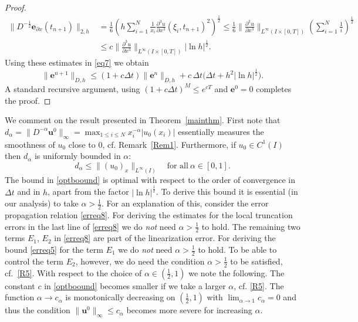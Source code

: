 \documentclass{siamltex}
\newcommand{\be}{\mathbf e}
\newcommand{\bu}{\mathbf u}
\begin{document}
{\begin{proof}
\[ \begin{split} 
  \|D^{-\frac12}\be_{\partial x}(t_{n+1})\|_{2,h} & = \frac16 \left( h \sum_{i=1}^N \frac{1}{x_i} \frac{\partial^3 u}{\partial x^3}(\xi_i,t_{n+1})^2 \right)^\frac12 
   \leq \frac{1}{6}\|\frac{\partial^3 u}{\partial  x^3}\|_{L^\infty(I\times[0,T])} \left( \sum_{i=1}^N \frac{1}{i}\right)^\frac12 \\
  & \leq c \|\frac{\partial^3 u}{\partial  x^3}\|_{L^\infty(I\times[0,T])} |\ln h|^\frac12.
\end{split} \]
Using these estimates in \eqref{eq7} we obtain
\[
  \|\be^{n+1}\|_{D,h} \leq (1 + c \Delta t)\|\be^n\|_{D,h} + c\, \Delta t \big( \Delta t + h^2 |\ln h|^\frac12\big).
\]
A standard recursive argument, using $(1+ c \Delta t)^M \leq e^{c T}$ and $\be^0=0$ completes the proof.
\end{proof}

We comment on the result presented in Theorem~\ref{mainthm}. First note that  $d_\alpha=\|D^{-\alpha}\bu^0\|_\infty= \max_{1 \leq i \leq N} x_i^{-\alpha}|u_0(x_i)|$ essentially measures the smoothness of $u_0$ close to 0, cf. Remark~\ref{Rem1}. 
Furthermore, if $u_0 \in C^1(I)$ then $d_\alpha$ is uniformly bounded in $\alpha$: 
\begin{equation} \label{destimate} d_\alpha \leq \|(u_0)_x\|_{L^\infty(I)} \quad \text{for all}~\alpha \in [0,1]. 
\end{equation}
The bound in \eqref{optboound} is optimal with respect to the order of convergence in $\Delta t$ and in $h$, apart from the factor $|\ln h|^\frac12$. To derive this bound it is essential (in our analysis) to take $\alpha > \tfrac12$. For an explanation of this, consider the error propagation relation \eqref{erreq8}. For  deriving the estimates for the local truncation errors in the last line of \eqref{erreq8} we do \emph{not} need $\alpha > \tfrac12$ to hold. The remaining two terms $E_1$, $E_2$ in \eqref{erreq8} are part of the linearization error. For  deriving the bound \eqref{erreq5} for the term $E_1$ we do \emph{not} need $\alpha > \tfrac12$ to hold. To be able to control the term $E_2$, however, we do need the condition $\alpha > \tfrac12$ to be satisfied, cf.~\eqref{R5}. With respect to the choice of $\alpha \in (\frac12,1)$ we note the following. The constant $c$ in \eqref{optboound} becomes smaller if we take a larger $\alpha$, cf. \eqref{R5}. The function $\alpha \to c_\alpha$ is monotonically decreasing on $(\frac12,1)$ with $\lim_{\alpha \to 1}c_\alpha=0$  and thus the condition $\|\bu^0\|_\infty \leq c_\alpha$ becomes more severe for increasing $\alpha$. 


}
\end{document}
